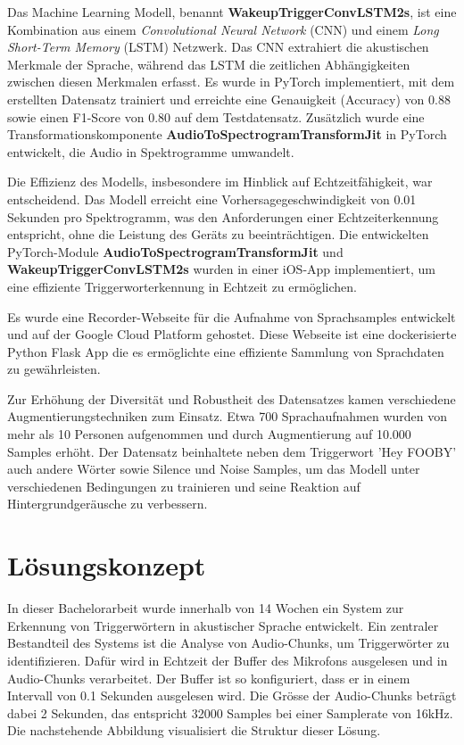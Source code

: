 \documentclass[11pt,a4paper]{article}
\begin{document}
\noindent
Das Machine Learning Modell, benannt \textbf{WakeupTriggerConvLSTM2s}, ist eine Kombination aus einem \textit{Convolutional Neural Network} (CNN) und einem \textit{Long Short-Term Memory} (LSTM) Netzwerk. Das CNN extrahiert die akustischen Merkmale der Sprache, während das LSTM die zeitlichen Abhängigkeiten zwischen diesen Merkmalen erfasst. Es wurde in PyTorch implementiert, mit dem erstellten Datensatz trainiert und erreichte eine Genauigkeit (Accuracy) von 0.88 sowie einen F1-Score von 0.80 auf dem Testdatensatz. Zusätzlich wurde eine Transformationskomponente \textbf{AudioToSpectrogramTransformJit} in PyTorch entwickelt, die Audio in Spektrogramme umwandelt.

\noindent \newline
Die Effizienz des Modells, insbesondere im Hinblick auf Echtzeitfähigkeit, war entscheidend. Das Modell erreicht eine Vorhersagegeschwindigkeit von 0.01 Sekunden pro Spektrogramm, was den Anforderungen einer Echtzeiterkennung entspricht, ohne die Leistung des Geräts zu beeinträchtigen. Die entwickelten PyTorch-Module \textbf{AudioToSpectrogramTransformJit} und \textbf{WakeupTriggerConvLSTM2s} wurden in einer iOS-App implementiert, um eine effiziente Triggerworterkennung in Echtzeit zu ermöglichen.

\noindent \newline
Es wurde eine Recorder-Webseite für die Aufnahme von Sprachsamples entwickelt und auf der Google Cloud Platform gehostet. Diese Webseite ist eine dockerisierte Python Flask App die es ermöglichte eine effiziente Sammlung von Sprachdaten zu gewährleisten.

\noindent \newline
Zur Erhöhung der Diversität und Robustheit des Datensatzes kamen verschiedene Augmentierungstechniken zum Einsatz. Etwa 700 Sprachaufnahmen wurden von mehr als 10 Personen aufgenommen und durch Augmentierung auf 10.000 Samples erhöht. Der Datensatz beinhaltete neben dem Triggerwort 'Hey FOOBY' auch andere Wörter sowie Silence und Noise Samples, um das Modell unter verschiedenen Bedingungen zu trainieren und seine Reaktion auf Hintergrundgeräusche zu verbessern.


\newpage
\section{Lösungskonzept}
In dieser Bachelorarbeit wurde innerhalb von 14 Wochen ein System zur Erkennung von Triggerwörtern in akustischer Sprache entwickelt. Ein zentraler Bestandteil des Systems ist die Analyse von Audio-Chunks, um Triggerwörter zu identifizieren. Dafür wird in Echtzeit der Buffer des Mikrofons ausgelesen und in Audio-Chunks verarbeitet. Der Buffer ist so konfiguriert, dass er in einem Intervall von 0.1 Sekunden ausgelesen wird. Die Grösse der Audio-Chunks beträgt dabei 2 Sekunden, das entspricht 32000 Samples bei einer Samplerate von 16kHz. Die nachstehende Abbildung visualisiert die Struktur dieser Lösung.
\end{document}
